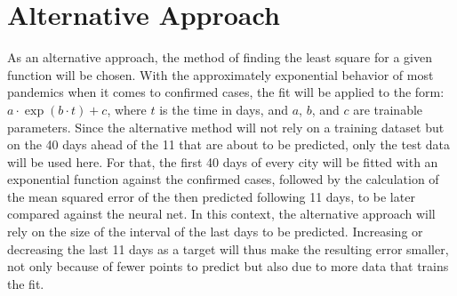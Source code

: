 
\section{Alternative Approach}
As an alternative approach, the method of finding the least square for a given function will be chosen. With the approximately exponential behavior of most pandemics when it comes to confirmed cases, the fit will be applied to the form: $a \cdot \exp(b \cdot t) + c$, where $t$ is the time in days, and $a$, $b$, and $c$ are trainable parameters.
Since the alternative method will not rely on a training dataset but on the 40 days ahead of the 11 that are about to be predicted, only the test data will be used here. For that, the first 40 days of every city will be fitted with an exponential function against the confirmed cases, followed by the calculation of the mean squared error of the then predicted following 11 days, to be later compared against the neural net.
In this context, the alternative approach will rely on the size of the interval of the last days to be predicted. Increasing or decreasing the last 11 days as a target will thus make the resulting error smaller, not only because of fewer points to predict but also due to more data that trains the fit.